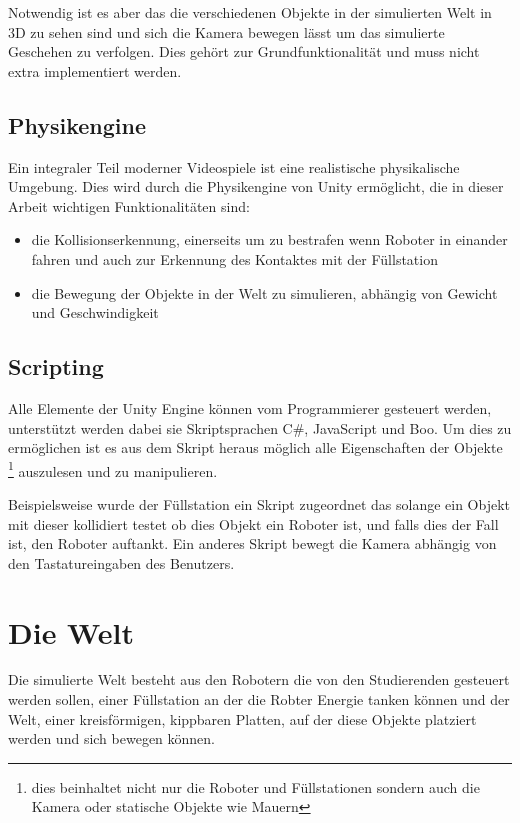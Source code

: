 \documentclass[
    12pt,
    bibliography=totoc,
    ngerman
]{scrartcl}
\begin{document}
Notwendig ist es aber das die verschiedenen Objekte in der simulierten Welt in 3D zu sehen sind und sich die Kamera bewegen l{\"{a}}sst um das simulierte Geschehen zu
verfolgen. Dies geh{\"{o}}rt zur Grundfunktionalit{\"{a}}t und muss nicht extra implementiert werden.

\subsection{Physikengine}
Ein integraler Teil moderner Videospiele ist eine realistische physikalische Umgebung. Dies wird durch die Physikengine von Unity erm{\"{o}}glicht, die in dieser
Arbeit wichtigen Funktionalit{\"{a}}ten sind:

\begin{itemize}
\item die Kollisionserkennung, einerseits um zu bestrafen wenn Roboter in einander fahren und auch zur Erkennung des Kontaktes mit der F{\"{u}}llstation
\item die Bewegung der Objekte in der Welt zu simulieren, abh{\"{a}}ngig von Gewicht und Geschwindigkeit
\end{itemize}

\subsection{Scripting}
Alle Elemente der Unity Engine k{\"{o}}nnen vom Programmierer gesteuert werden, unterst{\"{u}}tzt werden dabei sie Skriptsprachen C\#, JavaScript und Boo.\cite{wiki:unity} Um dies zu erm{\"{o}}glichen ist es aus dem Skript heraus m{\"{o}}glich alle Eigenschaften
der Objekte \footnote{dies beinhaltet nicht nur die Roboter und F{\"{u}}llstationen sondern auch die Kamera oder statische Objekte wie Mauern} auszulesen und zu manipulieren.

Beispielsweise wurde der F{\"{u}}llstation ein Skript zugeordnet das solange ein Objekt mit dieser kollidiert testet ob dies Objekt ein Roboter ist, und falls dies der Fall ist,
den Roboter auftankt. Ein anderes Skript bewegt die Kamera abh{\"{a}}ngig von den Tastatureingaben des Benutzers.

\clearpage
\section{Die Welt}
Die simulierte Welt besteht aus den Robotern die von den Studierenden gesteuert werden sollen, einer F{\"{u}}llstation an der die Robter Energie tanken k{\"{o}}nnen und
der Welt, einer kreisf{\"{o}}rmigen, kippbaren Platten, auf der diese Objekte platziert werden und sich bewegen k{\"{o}}nnen.
\end{document}
